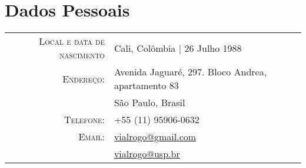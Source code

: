 \documentclass[a4paper,10pt]{article}
\begin{document}
\pagestyle{empty} %

\par{\bigskip\par}

\section{Dados Pessoais}

\begin{tabular}{rl}
  \textsc{Local e data de nascimento}   & Cali, Colômbia  | 26 Julho 1988 \\
  \textsc{Endereço:}                    & Avenida Jaguaré, 297. Bloco Andrea, apartamento 83\\
                                        & São Paulo, Brasil\\
  \textsc{Telefone:}                    & +55 (11) 95906-0632 \\
  \textsc{Email:}                       & \href{mailto:vialrogo@gmail.com}{vialrogo@gmail.com} \\
                                        & \href{mailto:vialrogo@usp.br}{vialrogo@usp.br} \\
\end{tabular}

\end{document}
